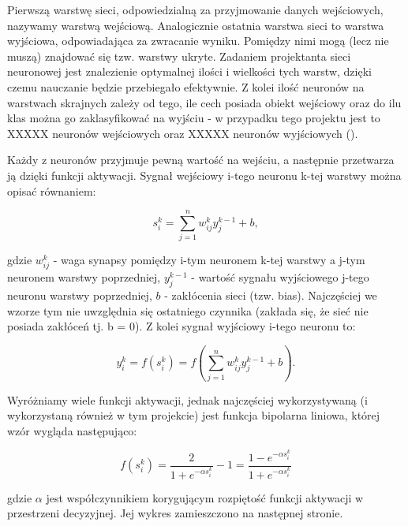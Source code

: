\documentclass[12pt,a4paper]{article}
\begin{document}
\vspace{5pt}
Pierwszą warstwę sieci, odpowiedzialną za przyjmowanie danych wejściowych, nazywamy warstwą wejściową. Analogicznie ostatnia warstwa sieci to warstwa wyjściowa, odpowiadająca za zwracanie wyniku. Pomiędzy nimi mogą (lecz nie muszą) znajdować się tzw. warstwy ukryte. Zadaniem projektanta sieci neuronowej jest znalezienie optymalnej ilości i wielkości tych warstw, dzięki czemu nauczanie będzie przebiegało efektywnie. Z kolei ilość neuronów na warstwach skrajnych zależy od tego, ile cech posiada obiekt wejściowy oraz do ilu klas można go zaklasyfikować na wyjściu - w przypadku tego projektu jest to XXXXX neuronów wejściowych oraz XXXXX neuronów wyjściowych ().

\vspace{5pt}
Każdy z neuronów przyjmuje pewną wartość na wejściu, a następnie przetwarza ją dzięki funkcji aktywacji. Sygnał wejściowy i-tego neuronu k-tej warstwy można opisać równaniem:

\begin{equation*}
    s^k_i = \sum_{j=1}^{n}w^k_{ij} y^{k-1}_{j} + b,
\end{equation*}

\noindent gdzie $w^k_{ij}$ - waga synapsy pomiędzy i-tym neuronem k-tej warstwy a j-tym neuronem warstwy poprzedniej, $y^{k-1}_{j}$ - wartość sygnału wyjściowego j-tego neuronu warstwy poprzedniej, $b$ - zakłócenia sieci (tzw. bias). Najczęściej we wzorze tym nie uwzględnia się ostatniego czynnika (zakłada się, że sieć nie posiada zakłóceń tj. b = 0). Z kolei sygnał wyjściowy i-tego neuronu to:

\begin{equation*}
    y^k_i = f(s^k_i) = f(\sum_{j=1}^{n}w^k_{ij} y^{k-1}_{j} + b).
\end{equation*}

Wyróżniamy wiele funkcji aktywacji, jednak najczęściej wykorzystywaną (i wykorzystaną również w tym projekcie) jest funkcja bipolarna liniowa, której wzór wygląda następująco:

\begin{equation*}
    f(s^k_i) = \frac{2}{1 + e^{-\alpha s^k_i}} - 1 = \frac{1 - e^{-\alpha s^k_i}}{1 + e^{-\alpha s^k_i}}
\end{equation*}

\noindent gdzie $\alpha$ jest współczynnikiem korygującym rozpiętość funkcji aktywacji w przestrzeni decyzyjnej. Jej wykres zamieszczono na następnej stronie.
\end{document}
